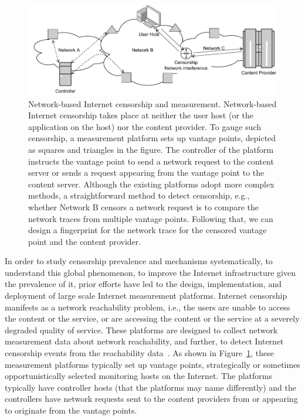 \begin{figure}[!htbp]
	\centering
	\includegraphics[width=0.9\columnwidth]{figures/censorship.pdf}
	\caption{Network-based Internet censorship and measurement. Network-based
	Internet censorship takes place at neither the user host (or the application
	on the host) nor the content provider. To gauge such censorship, a measurement
	platform sets up vantage points, depicted as squares and triangles in the
	figure. The controller of the platform instructs the vantage point to
	send a network request to the content server or sends a request appearing
	from the vantage point to the content server. Although the existing platforms
	adopt more complex methods, a straightforward method to detect censorship, e.g., whether Network
	B censors a network request is to compare the network traces from multiple
	vantage points. Following that, we can design a fingerprint for the network
	trace for the censored vantage point and the content provider.} 
	\label{fig:nicensor}
\end{figure}

In order to study censorship prevalence and mechanisms systematically, to understand this global phenomenon,
to improve the Internet infrastructure given
the prevalence of it, 
prior efforts have led to
the design, implementation, and deployment of large scale Internet measurement
platforms.  
Internet censorship
manifests as a network reachability problem, i.e., the users are unable to
access the content or the service, or are accessing the content or the service
at a severely degraded quality of service. These platforms are designed to collect
network measurement data about network reachability, 
and further, to detect Internet censorship events from the
reachability data~\cite{sundara_raman_censored_2020, niaki2020iclab,
filasto2012ooni}.
As shown in Figure~\ref{fig:nicensor}, these measurement platforms typically
set up vantage points, strategically or sometimes opportunistically selected
monitoring hosts on the Internet. The platforms typically have controller hosts
(that the platforms may name differently)
and the controllers have network requests sent to the content providers from or
appearing to originate from the vantage points. 

